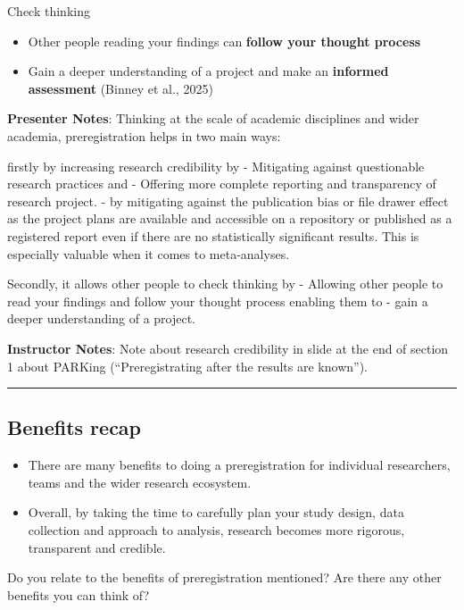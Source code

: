 \documentclass[
  letterpaper,
  DIV=11,
  numbers=noendperiod]{scrartcl}
\providecommand{\tightlist}{%
  \setlength{\itemsep}{0pt}\setlength{\parskip}{0pt}}
\begin{document}
Check thinking

\begin{itemize}
\tightlist
\item
  Other people reading your findings can \textbf{follow your thought
  process}
\item
  Gain a deeper understanding of a project and make an \textbf{informed
  assessment} (Binney et al., 2025)
\end{itemize}

\textbf{Presenter Notes}: Thinking at the scale of academic disciplines
and wider academia, preregistration helps in two main ways:

firstly by increasing research credibility by - Mitigating against
questionable research practices and - Offering more complete reporting
and transparency of research project. - by mitigating against the
publication bias or file drawer effect as the project plans are
available and accessible on a repository or published as a registered
report even if there are no statistically significant results. This is
especially valuable when it comes to meta-analyses.

Secondly, it allows other people to check thinking by - Allowing other
people to read your findings and follow your thought process enabling
them to - gain a deeper understanding of a project.

\textbf{Instructor Notes}: Note about research credibility in slide at
the end of section 1 about PARKing (``Preregistrating after the results
are known'').

\begin{center}\rule{0.5\linewidth}{0.5pt}\end{center}

\subsection{Benefits recap}\label{benefits-recap}

\begin{itemize}
\item
  There are many benefits to doing a preregistration for individual
  researchers, teams and the wider research ecosystem.
\item
  Overall, by taking the time to carefully plan your study design, data
  collection and approach to analysis, research becomes more rigorous,
  transparent and credible.
\end{itemize}

\begin{tcolorbox}[enhanced jigsaw, arc=.35mm, bottomrule=.15mm, bottomtitle=1mm, breakable, colback=white, colbacktitle=quarto-callout-note-color!10!white, colframe=quarto-callout-note-color-frame, coltitle=black, left=2mm, leftrule=.75mm, opacityback=0, opacitybacktitle=0.6, rightrule=.15mm, title=\textcolor{quarto-callout-note-color}{\faInfo}\hspace{0.5em}{Reflection point}, titlerule=0mm, toprule=.15mm, toptitle=1mm]

Do you relate to the benefits of preregistration mentioned? Are there
any other benefits you can think of?

\end{tcolorbox}
\end{document}
